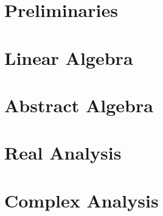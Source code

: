 \documentclass[10pt,a4paper]{extreport}
\begin{document}

\pagebreak


\pagebreak

\setcounter{page}{1}

\pagebreak


\pagebreak

\tableofcontents
\pagebreak

\setcounter{page}{1}
\part{Preliminaries}\label{part:prelim}



\part{Linear Algebra}\label{part:linear-algebra}




\part{Abstract Algebra}\label{part:abstract-algebra}

%
%

\part{Real Analysis}\label{part:real-analysis}









\part{Complex Analysis}\label{part:complex-analysis}


\end{document}
